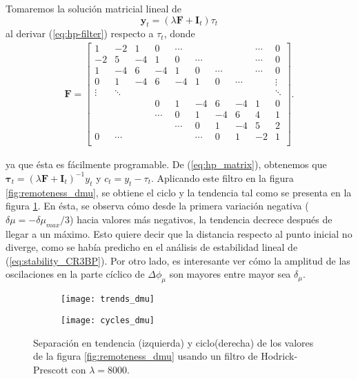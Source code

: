 Tomaremos la solución matricial lineal de \cite{Kim2004}  
\begin{equation}
 \mathbf{y}_t = \left( \lambda \mathbf{F} + \mathbf{I}_t \right) \tau_t
 \label{eq:hp_matrix}
\end{equation}  
al derivar (\ref{eq:hp-filter}) respecto a $\tau_t$, donde
\begin{align}
 \mathbf{F} = \left[ \begin{array}{cccccccccc}
 1  & -2 & 1  & 0  & \cdots &        &        & & \cdots & 0    \\
 -2 & 5  & -4 & 1  & 0      & \cdots &        & & \cdots & 0    \\
 1  & -4 & 6  & -4 & 1      & 0      & \cdots & & \cdots & 0    \\
 0  & 1  & -4 & 6  & -4 & 1 & 0      & \cdots &        & \vdots \\
 \vdots  & \ddots  &  &  &  &  &  &  &        & \ddots          \\
    &    &    &  0 &  1 &-4 &    6   & -4     &      1 & 0      \\
   &   &  & \cdots &  0 & 1 &   -4   &  6     &      4 & 1      \\
   &   &  &  &   \cdots & 0 &    1   &  -4    &      5 & 2      \\
 0 &\cdots&  &  &  & \cdots &    0   &   1    &     -2 & 1      \\
 \end{array} \right].
\end{align}

ya que ésta es fácilmente programable. De (\ref{eq:hp_matrix}), obtenemos que $\mathbf{\tau}_t = \left( \lambda \mathbf{F} + \mathbf{I}_t \right)^{-1} y_t$ y $c_t = y_t - \tau_t$. Aplicando este filtro en la figura \ref{fig:remoteness_dmu}, se obtiene el ciclo y la tendencia tal como se presenta en la figura \ref{fig:trendcycle_dmu}. En ésta, se observa cómo desde la primera variación negativa ($\delta\mu = -\delta\mu_{max}/3$) hacia valores más negativos, la tendencia decrece después de llegar a un máximo. Esto quiere decir que la distancia respecto al punto inicial no diverge, como se había predicho en el análisis de estabilidad lineal de (\ref{eq:stability_CR3BP}). Por otro lado, es interesante ver cómo la amplitud de las oscilaciones en la parte cíclico de $\Delta\phi_\mu$ son mayores entre mayor sea $\delta_\mu$.

\begin{figure}[h!]
\centering
\begin{subfigure}{0.49\textwidth}
	\centering
	\texttt{[image: trends\_dmu]}
\end{subfigure}
%
\begin{subfigure}{0.49\textwidth}
	\centering
	\texttt{[image: cycles\_dmu]}
\end{subfigure}
\caption{ Separación en tendencia (izquierda) y ciclo(derecha) de los valores de la figura \ref{fig:remoteness_dmu} usando un filtro de Hodrick-Prescott con $\lambda = 8000$.}
\label{fig:trendcycle_dmu}
\end{figure}

